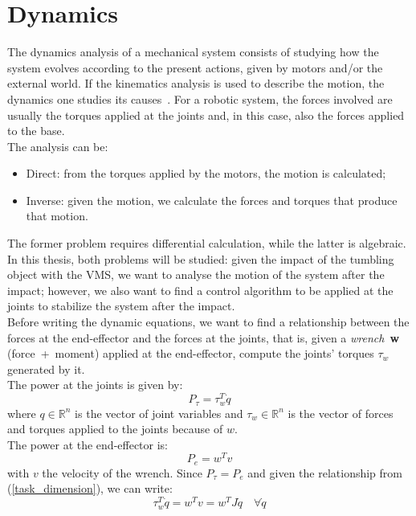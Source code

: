 \documentclass[a4paper,12pt,oneside]{report}
\begin{document}
\chapter{Dynamics}\label{dynamics}
The dynamics analysis of a mechanical system consists of studying how the system evolves according to the present actions, given by motors and/or the external world. If the kinematics analysis is used to describe the motion, the dynamics one studies its causes~\cite{eleven}. For a robotic system, the forces involved are usually the torques applied at the joints and, in this case, also the forces applied to the base.\\
The analysis can be:
\begin{itemize}
  \item Direct: from the torques applied by the motors, the motion is calculated;
  \item Inverse: given the motion, we calculate the forces and torques that produce that motion.
\end{itemize}
The former problem requires differential calculation, while the latter is algebraic.\\
In this thesis, both problems will be studied: given the impact of the tumbling object with the VMS, we want to analyse the motion of the system after the impact; however, we also want to find a control algorithm to be applied at the joints to stabilize the system after the impact.\\
Before writing the dynamic equations, we want to find a relationship between the forces at the end-effector and the forces at the joints, that is, given a \textit{wrench}~\textbf{w} (force~+~moment) applied at the end-effector, compute the joints' torques $\tau_w$ generated by it.\\
The power at the joints is given by:
\begin{equation}
  P_{\tau}=\tau_w^T\dot{q}
\end{equation}
where $q \in \mathbb{R}^n$ is the vector of joint variables and  $\tau_w \in \mathbb{R}^n$ is the vector of forces and torques applied to the joints because of $w$.\\
The power at the end-effector is:
\begin{equation}
  P_e=w^Tv
\end{equation}
with $v$ the velocity of the wrench. Since $P_\tau=P_e$ and given the relationship from (\ref{task_dimension}), we can write:
\begin{equation}
  \tau_w^T\dot{q}=w^Tv=w^TJ\dot{q} \quad \forall\dot{q}
\end{equation}
\end{document}
